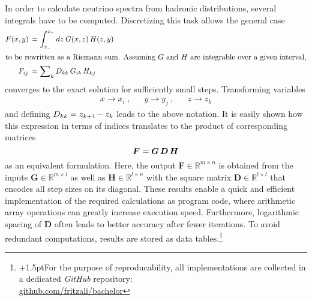 In order to calculate neutrino spectra from hadronic distributions, several integrals have to be computed. Discretizing
this task allows the general case
\begin{align*}
	F(x, y) \kern+1.5pt &= \int_{z_{-}}^{z_{+}} dz \: G(x, z) \, H(z, y) \\
	\intertext{to be rewritten as a Riemann sum. Assuming $G$ and $H$ are integrable over a given interval,}
	F_{ij} \kern+1.8pt &= \sum\nolimits_k D_{kk} \, G_{ik} \, H_{kj}
\end{align*}
converges to the exact solution for sufficiently small steps. Transforming variables
\begin{align*}
	&&&& x \rightarrow x_i \: , && y \rightarrow y_j \: , && z \rightarrow z_k &&&&
\end{align*}
and defining $D_{kk} = z_{k+1} \kern-1.0pt - z_k$ leads to the above notation. It is easily shown how this expression in terms of
indices translates to the product of corresponding matrices
\begin{equation*}
	\bm{F} \kern+0.6pt = \bm{G} \, \bm{D} \, \bm{H}
\end{equation*}
as an equivalent formulation. Here, the output $\bm{F} \in \mathbb{R}^{m \times n}$ is obtained from the inputs
$\bm{G} \in \mathbb{R}^{m \times l}$ as well as $\bm{H} \in \mathbb{R}^{l \times n}$ with the square matrix
$\bm{D} \in \mathbb{R}^{l \times l}$ that encodes all step sizes on its diagonal. These results enable a quick and
efficient implementation of the required calculations as program code, where arithmetic array operations can greatly
increase execution speed. Furthermore, logarithmic spacing of $\bm{D}$ often leads to better accuracy after fewer
iterations. To avoid redundant computations, results are stored as data tables.\footnote{
{\kern+1.5pt}For the purpose of reproducability, all implementations are collected in a dedicated \emph{GitHub} repository:\\
\href{https://github.com/fritzali/bachelor}{github.com/fritzali/bachelor}}



